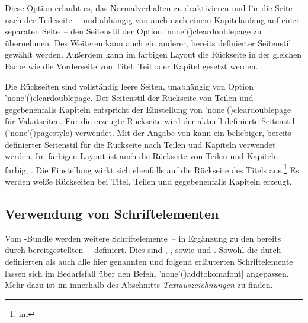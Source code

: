 \begin{DeclareEntity*}{}
\begin{DeclareEntity*}{}
\begin{DeclareEntity*}{}
\begin{Declaration}
Diese Option erlaubt es, das Normalverhalten zu deaktivieren und für die Seite 
nach der Teileseite~-- und abhängig von  auch nach einem 
Kapitelanfang auf einer separaten Seite~-- den Seitenstil der Option 
\Option'none'(){cleardoublepage} zu übernehmen. Des 
Weiteren kann auch ein anderer, bereits definierter Seitenstil gewählt werden. 
Außerdem kann im farbigen Layout die Rückseite in der gleichen Farbe wie die 
Vorderseite von Titel, Teil oder Kapitel gesetzt werden. 
\notudscrartcl
\begin{DeclareValues}{}
  Die Rückseiten sind vollständig leere Seiten, unabhängig von Option
  \Option'none'(){cleardoublepage}.
  Der Seitenstil der Rückseite von Teilen und gegebenenfalls Kapiteln entspricht
  der Einstellung von \Option'none'(){cleardoublepage} für 
  Vakatseiten.
  Für die erzeugte Rückseite wird der aktuell definierte Seitenstil 
  (\Macro'none'(){pagestyle}) verwendet.
  Mit der Angabe von  
  kann ein beliebiger, bereits definierter Seitenstil für die Rückseite nach 
  Teilen und Kapiteln verwendet werden.
  Im farbigen Layout ist auch die Rückseite von Teilen und Kapiteln farbig, 
  . Die Einstellung wirkt sich ebenfalls auf die 
  Rückseite des Titels aus.\footnote{%
     im \scrguide%
  }%
  Es werden weiße Rückseiten bei Titel, Teilen und gegebenenfalls Kapiteln 
  erzeugt.
\end{DeclareValues}
\end{Declaration}
%



\subsection{%
  Verwendung von Schriftelementen%
  \label{sec:fonts:elements}%
}

Vom \TUDScript-Bundle werden weitere Schriftelemente~-- in Ergänzung zu den 
bereits durch \KOMAScript{} bereitgestellten~-- definiert. Dies sind 
, ,  sowie 
und . Sowohl die durch \KOMAScript{} definierten als auch 
alle hier genannten und folgend erläuterten Schriftelemente lassen sich im 
Bedarfsfall über den Befehl
\Macro'none'(){addtokomafont|}
angepassen. Mehr dazu ist im \scrguide innerhalb 
des Abschnitts \emph{Textauszeichnungen} zu finden.




\end{DeclareEntity*}
\end{DeclareEntity*}
\end{DeclareEntity*}
